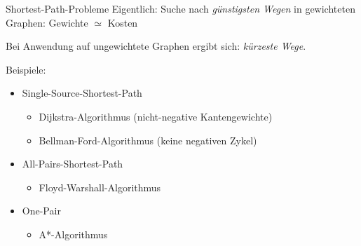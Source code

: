 \begin{defi}{Shortest-Path-Probleme}
    Eigentlich: Suche nach \emph{günstigsten Wegen} in gewichteten Graphen: Gewichte $\simeq$ Kosten

    Bei Anwendung auf ungewichtete Graphen ergibt sich: \emph{kürzeste Wege}.

    Beispiele:
    \begin{itemize}
        \item Single-Source-Shortest-Path
              \begin{itemize}
                  \item Dijkstra-Algorithmus (nicht-negative Kantengewichte)
                  \item Bellman-Ford-Algorithmus (keine negativen Zykel)
              \end{itemize}
        \item All-Pairs-Shortest-Path
              \begin{itemize}
                  \item Floyd-Warshall-Algorithmus
              \end{itemize}
        \item One-Pair
              \begin{itemize}
                  \item A*-Algorithmus
              \end{itemize}
    \end{itemize}
\end{defi}

